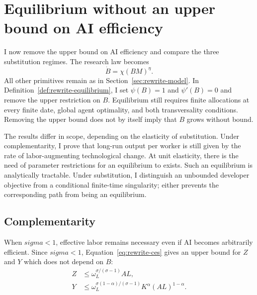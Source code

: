 \section{Equilibrium without an upper bound on AI efficiency}
\label{sec:rewrite-uncapped}

I now remove the upper bound on AI efficiency and compare the three
substitution regimes. The research law becomes
\begin{equation}
 \dot B=\chi(BM)^\eta.
 \label{eq:rewrite-uncapped-unit-law}
\end{equation}
All other primitives remain as in Section~\ref{sec:rewrite-model}.
In Definition~\ref{def:rewrite-equilibrium}, I set $\psi(B)=1$ and
$\psi'(B)=0$ and remove the upper restriction on $B$. Equilibrium still
requires finite allocations at every finite date, global agent optimality,
and both transversality conditions. Removing the upper bound does not by itself
imply that $B$ grows without bound.

The results differ in scope, depending on the elasticity of substitution. Under complementarity, I prove that long-run output per worker is still given by the rate of labor-augmenting technological change. At unit elasticity, there is the need of parameter restrictions for an equilibrium to exists. Such an equilibrium is analytically tractable. Under substitution, I distinguish an unbounded developer objective from a conditional finite-time singularity; either prevents the corresponding path from being an equilibrium.

\subsection{Complementarity}
\label{subsec:rewrite-uncapped-complements}

When $sigma<1$, effective labor remains necessary even if AI becomes arbitrarily efficient. Since $sigma<1$,  Equation~\eqref{eq:rewrite-ces} gives an upper bound for $Z$ and $Y$ which does not depend on $B$:
\begin{align}
 Z&\leq\omega_L^{\sigma/(\sigma-1)}AL,
 \label{eq:rewrite-uncapped-complements-z-bound}\\
 Y&\leq\omega_L^{\sigma(1-\alpha)/(\sigma-1)}
 K^\alpha(AL)^{1-\alpha}.
 \label{eq:rewrite-uncapped-complements-y-bound}
\end{align}

